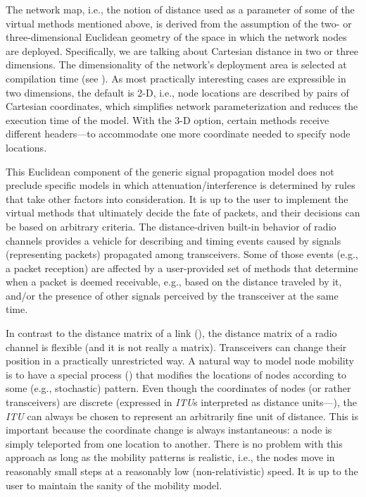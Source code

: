 The network map, i.e., the notion of distance used as a parameter of some of
the virtual methods mentioned above, is derived from the assumption of the
two- or three-dimensional Euclidean
geometry of the space in which the network nodes are deployed.
Specifically, we are talking about Cartesian distance in two or three
dimensions.
The dimensionality of the network's deployment area is selected at
compilation time (see ).
As most practically interesting cases are expressible in two dimensions,
the default is 2-D, i.e., node locations are described by pairs of
Cartesian coordinates,
which simplifies network parameterization and reduces the execution time
of the model.
With the 3-D option, certain methods receive different headers---to
accommodate one more coordinate needed to specify node locations.

This Euclidean component of the generic signal propagation model
does not preclude specific
models in which attenuation/interference is determined
by rules that take other factors into consideration.
It is up to the user to implement the virtual methods that ultimately decide 
the fate of packets, and their decisions can be based on arbitrary criteria.
The distance-driven built-in behavior of radio channels provides a
vehicle for describing and timing events caused by signals (representing
packets) propagated among transceivers.
Some of those events (e.g., a packet reception) are affected by a
user-provided set of methods that determine when a packet is deemed
receivable, e.g., based on the distance traveled by it, and/or the presence
of other signals perceived by the transceiver at the same time.

In contrast to the distance matrix of a link (), the distance
matrix of a radio channel is flexible (and it is not really a matrix).
Transceivers can change their position in a practically unrestricted way.
A natural way to model node mobility is to have a special process
() that modifies the locations of nodes according to some
(e.g., stochastic) pattern.
Even though the coordinates of nodes (or rather transceivers) are discrete
(expressed in {\em ITU\/}s interpreted as distance units---),
the {\em ITU\/} can always be chosen to represent an arbitrarily fine unit of
distance.
This is important because the coordinate change is always instantaneous:
a node is simply teleported from one location to another.
There is no problem with this approach as long as the mobility patterns
is realistic, i.e., the nodes move in reasonably small steps at a
reasonably low (non-relativistic) speed.
It is up to the user to maintain the sanity of the mobility model.

